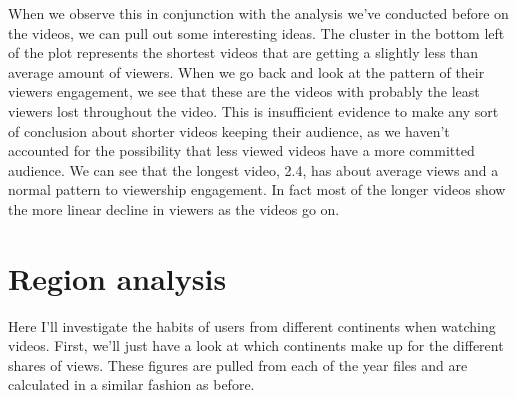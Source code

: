 \documentclass[
]{article}
\begin{document}
When we observe this in conjunction with the analysis we've conducted
before on the videos, we can pull out some interesting ideas. The
cluster in the bottom left of the plot represents the shortest videos
that are getting a slightly less than average amount of viewers. When we
go back and look at the pattern of their viewers engagement, we see that
these are the videos with probably the least viewers lost throughout the
video. This is insufficient evidence to make any sort of conclusion
about shorter videos keeping their audience, as we haven't accounted for
the possibility that less viewed videos have a more committed audience.
We can see that the longest video, 2.4, has about average views and a
normal pattern to viewership engagement. In fact most of the longer
videos show the more linear decline in viewers as the videos go on.

\hypertarget{region-analysis}{%
\section{Region analysis}\label{region-analysis}}

Here I'll investigate the habits of users from different continents when
watching videos. First, we'll just have a look at which continents make
up for the different shares of views. These figures are pulled from each
of the year files and are calculated in a similar fashion as before.
\end{document}
